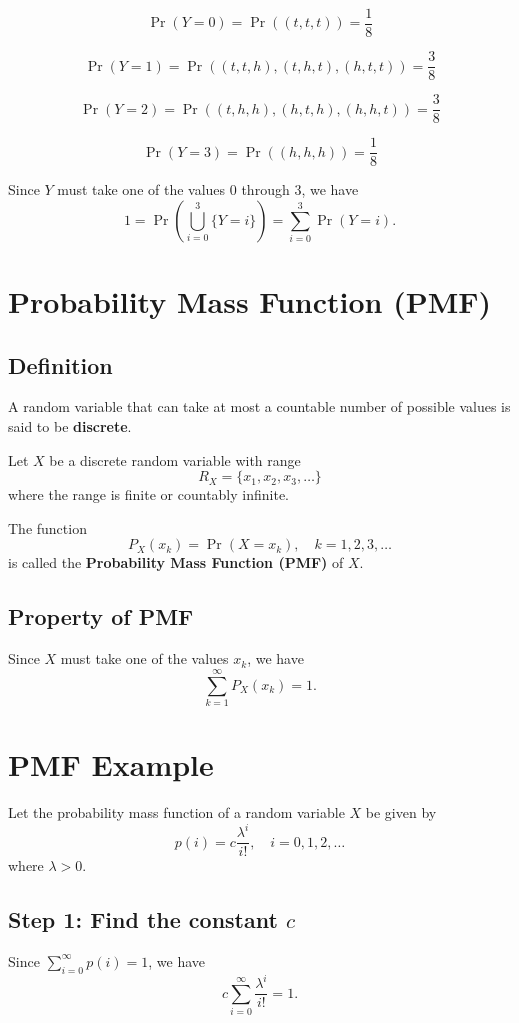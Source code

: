 \documentclass[12pt]{article}
\begin{document}
\[
\Pr(Y = 0) = \Pr((t,t,t)) = \frac{1}{8}
\]

\[
\Pr(Y = 1) = \Pr((t,t,h),(t,h,t),(h,t,t)) = \frac{3}{8}
\]

\[
\Pr(Y = 2) = \Pr((t,h,h),(h,t,h),(h,h,t)) = \frac{3}{8}
\]

\[
\Pr(Y = 3) = \Pr((h,h,h)) = \frac{1}{8}
\]

Since $Y$ must take one of the values $0$ through $3$, we have
\[
1 = \Pr\left(\bigcup_{i=0}^{3} \{Y = i\}\right)
  = \sum_{i=0}^{3} \Pr(Y = i).
\]

\section{Probability Mass Function (PMF)}

\subsection{Definition}
A random variable that can take at most a countable number of possible values is said to be \textbf{discrete}.

Let $X$ be a discrete random variable with range
\[
R_X = \{x_1, x_2, x_3, \dots\}
\]
where the range is finite or countably infinite.

The function
\[
P_X(x_k) = \Pr(X = x_k), \quad k = 1,2,3,\dots
\]
is called the \textbf{Probability Mass Function (PMF)} of $X$.

\subsection{Property of PMF}
Since $X$ must take one of the values $x_k$, we have
\[
\sum_{k=1}^{\infty} P_X(x_k) = 1.
\]

\section{PMF Example}

Let the probability mass function of a random variable $X$ be given by
\[
p(i) = c \frac{\lambda^i}{i!}, \quad i = 0,1,2,\dots
\]
where $\lambda > 0$.

\subsection*{Step 1: Find the constant $c$}

Since $\sum_{i=0}^{\infty} p(i) = 1$, we have
\[
c \sum_{i=0}^{\infty} \frac{\lambda^i}{i!} = 1.
\]
\end{document}
